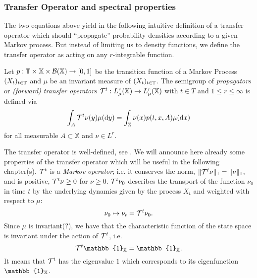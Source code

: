\subsubsection*{Transfer Operator and spectral properties}
The two equations above yield in the following intuitive definition of a transfer operator which should ``propagate'' probability densities according to a given Markov process. But instead of limiting us to density functions, we define the transfer operator as acting on any $r$-integrable function.

\begin{defi} 
Let $p: \mathbb{T} \times \mathbb{X} \times \mathcal{B}(\mathbb{X}) \rightarrow [0,1]$ be the transition function of a Markov Process $(X_t)_{t\in\mathbb{T}}$ and $\mu$ be an invariant measure of $(X_t)_{t\in\mathbb{T}}$.
The semigroup of \textit{propagators} or \textit{(forward) transfer operators} $\mathcal{T}^t : L_\mu^r (\mathbb{X}) \rightarrow L_\mu^r (\mathbb{X})$ with $t \in T$ and $1\leq r \leq \infty$ is defined via
\begin{equation}
\int_A \mathcal{T}^t \nu(y) \mu(\mathop{}\!\mathrm{d} y) = \int_\mathbb{X} \nu(x)p(t,x,A) \mu(\mathop{}\!\mathrm{d} x)
\end{equation}
for all measurable $A \subset \mathbb{X}$ and $\nu \in L^r$. 
\end{defi}
The transfer operator is well-defined, see \cite{huisinga2001metastability}.
We will announce here already some properties of the transfer operator which will be useful in the following chapter(s).
$\mathcal{T}^t$ is a \textit{Markov operator}; i.e. it conserves the norm, $\Vert \mathcal{T}^t\nu \Vert_1 = \Vert \nu \Vert_1$, and is positive, $\mathcal{T}^t \nu \geq 0$ for $\nu \geq 0$. 
$\mathcal{T}^t \nu_0$ describes the transport of the function $\nu_0$ in time $t$ by the underlying dynamics given by the process $X_t$ and weighted with respect to $\mu$:
\begin{equation*}
\nu_0 \mapsto \nu_t = \mathcal{T}^t \nu_0.
\end{equation*}
Since $\mu$ is invariant(?), we have that the characteristic function of the state space is invariant under the action of $\mathcal{T}^t$, i.e.
\begin{equation*}
\Tcal^t \mathbb{1}_\X = \mathbb{1}_\X.
\end{equation*}
It means that $\mathcal{T}^t$ has the eigenvalue $1$ which corresponds to its eigenfunction $\mathbb{1}_\X$.
\\

